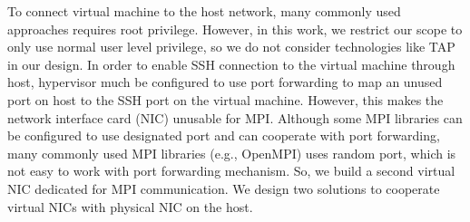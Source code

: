 To connect virtual machine to the host network, many commonly used approaches requires root privilege. However, in this work, we restrict our scope to only use normal user level privilege, so we do not consider technologies like TAP in our design. In order to enable SSH connection to the virtual machine through host, hypervisor much be configured to use port forwarding to map an unused port on host to the SSH port on the virtual machine. However, this makes the network interface card (NIC) unusable for MPI. Although some MPI libraries can be configured to use designated port and can cooperate with port forwarding, many commonly used MPI libraries (e.g., OpenMPI) uses random port, which is not easy to work with port forwarding mechanism. So, we build a second virtual NIC dedicated for MPI communication. We design two solutions to cooperate virtual NICs with physical NIC on the host. 

 
